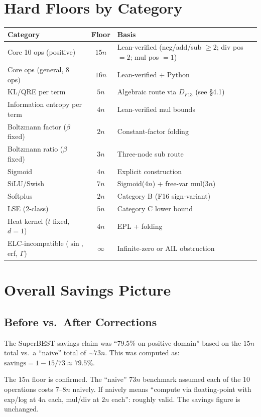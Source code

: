 \documentclass[11pt]{article}
\begin{document}
\section{Hard Floors by Category}

\begin{center}
\begin{tabular}{lcp{6cm}}
\toprule
Category & Floor & Basis \\
\midrule
Core 10 ops (positive) & $15n$ & Lean-verified (neg/add/sub $\geq 2$; div pos $= 2$; mul pos $= 1$) \\
Core ops (general, 8 ops) & $16n$ & Lean-verified + Python \\
KL/QRE per term & $5n$ & Algebraic route via $D_{F13}$ (see §4.1) \\
Information entropy per term & $4n$ & Lean-verified mul bounds \\
Boltzmann factor ($\beta$ fixed) & $2n$ & Constant-factor folding \\
Boltzmann ratio ($\beta$ fixed) & $3n$ & Three-node sub route \\
Sigmoid & $4n$ & Explicit construction \\
SiLU/Swish & $7n$ & Sigmoid($4n$) + free-var mul($3n$) \\
Softplus & $2n$ & Category B (F16 sign-variant) \\
LSE (2-class) & $5n$ & Category C lower bound \\
Heat kernel ($t$ fixed, $d=1$) & $4n$ & EPL + folding \\
ELC-incompatible ($\sin$, erf, $\Gamma$) & $\infty$ & Infinite-zero or AIL obstruction \\
\bottomrule
\end{tabular}
\end{center}

\section{Overall Savings Picture}

\subsection{Before vs.\ After Corrections}

The SuperBEST savings claim was ``79.5\% on positive domain'' based on the $15n$ total
vs.\ a ``naive'' total of $\sim 73n$. This was computed as:
$\text{savings} = 1 - 15/73 \approx 79.5\%$.

The $15n$ floor is confirmed. The ``naive'' $73n$ benchmark assumed each of the 10 operations
costs $7$--$8n$ naively. If naively means ``compute via floating-point with exp/log at $4n$ each,
mul/div at $2n$ each'': roughly valid. The savings figure is unchanged.
\end{document}
